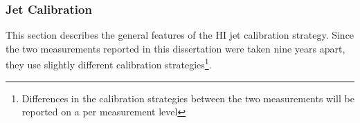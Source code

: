 



\FloatBarrier
\subsubsection{Jet Calibration}
\label{sec:jet_calibration}
This section describes the general features of the HI jet calibration strategy.  Since the two measurements reported in this dissertation were taken nine years apart, they use slightly different calibration strategies\footnote{Differences in the calibration strategies between the two measurements will be reported on a per measurement level}.

